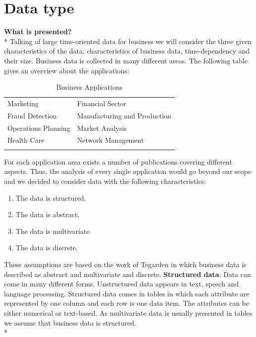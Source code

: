 \section{Data type} \label{data}

\textbf{What is presented?}\\*
Talking of large time-oriented data for business we will consider the three given characteristics of the data: characteristics of business data, time-dependency and their size. Business data is collected in many different areas. The following table gives an overview about the applications: 

\begin{table}[H]
	\centering
	\caption[Business Applications]{Business Applications\cite{Brachman1996,Tegarden1999}}
	\label{businessapplications}
	\begin{tabular}{ll}
	\toprule
	Marketing & Financial Sector \\
	Fraud Detection & Manufacturing and Production \\
	Operations Planning & Market Analysis \\
	Health Care & Network Management\\
	\bottomrule
	\label{table:applications}
	\end{tabular}
\end{table}
For each application area exists a number of publications covering different aspects. Thus, the analysis of every single application would go beyond our scope and we decided to consider data with the following characteristics: 
\begin{enumerate}
    \item The data is structured. 
    \item The data is abstract.
    \item The data is multivariate.
    \item The data is discrete.
\end{enumerate}
These assumptions are based on the work of Tegarden in which business data is described as abstract and multivariate and discrete\cite{Tegarden1999}.
\textbf{Structured data}: Data can come in many different forms. Unstructured data appears in text, speech and language processing\cite{Borgo2013}. Structured data comes in tables in which each attribute are represented by one column and each row is one data item. The attributes can be either numerical or text-based. As multivariate data is usually presented in tables\cite{Borgo2013} we assume that business data is structured.\\*
